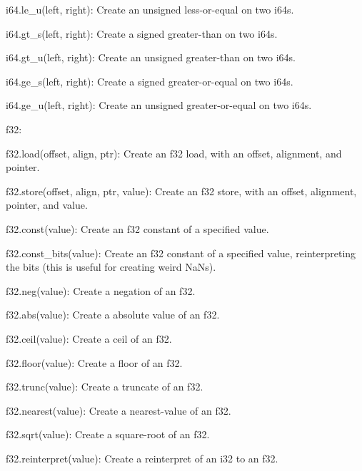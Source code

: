 \begin{DoxyItemize}
\begin{DoxyItemize}
\item {\ttfamily i64.\+le\+\_\+u(left, right)}\+: Create an unsigned less-\/or-\/equal on two {\ttfamily i64}s.
\item {\ttfamily i64.\+gt\+\_\+s(left, right)}\+: Create a signed greater-\/than on two {\ttfamily i64}s.
\item {\ttfamily i64.\+gt\+\_\+u(left, right)}\+: Create an unsigned greater-\/than on two {\ttfamily i64}s.
\item {\ttfamily i64.\+ge\+\_\+s(left, right)}\+: Create a signed greater-\/or-\/equal on two {\ttfamily i64}s.
\item {\ttfamily i64.\+ge\+\_\+u(left, right)}\+: Create an unsigned greater-\/or-\/equal on two {\ttfamily i64}s.
\end{DoxyItemize}
\item {\ttfamily f32}\+:
\begin{DoxyItemize}
\item {\ttfamily f32.\+load(offset, align, ptr)}\+: Create an {\ttfamily f32} load, with an offset, alignment, and pointer.
\item {\ttfamily f32.\+store(offset, align, ptr, value)}\+: Create an {\ttfamily f32} store, with an offset, alignment, pointer, and value.
\item {\ttfamily f32.\+const(value)}\+: Create an {\ttfamily f32} constant of a specified value.
\item {\ttfamily f32.\+const\+\_\+bits(value)}\+: Create an {\ttfamily f32} constant of a specified value, reinterpreting the bits (this is useful for creating weird Na\+Ns).
\item {\ttfamily f32.\+neg(value)}\+: Create a negation of an {\ttfamily f32}.
\item {\ttfamily f32.\+abs(value)}\+: Create a absolute value of an {\ttfamily f32}.
\item {\ttfamily f32.\+ceil(value)}\+: Create a ceil of an {\ttfamily f32}.
\item {\ttfamily f32.\+floor(value)}\+: Create a floor of an {\ttfamily f32}.
\item {\ttfamily f32.\+trunc(value)}\+: Create a truncate of an {\ttfamily f32}.
\item {\ttfamily f32.\+nearest(value)}\+: Create a nearest-\/value of an {\ttfamily f32}.
\item {\ttfamily f32.\+sqrt(value)}\+: Create a square-\/root of an {\ttfamily f32}.
\item {\ttfamily f32.\+reinterpret(value)}\+: Create a reinterpret of an {\ttfamily i32} to an {\ttfamily f32}.

\end{DoxyItemize}
\end{DoxyItemize}

